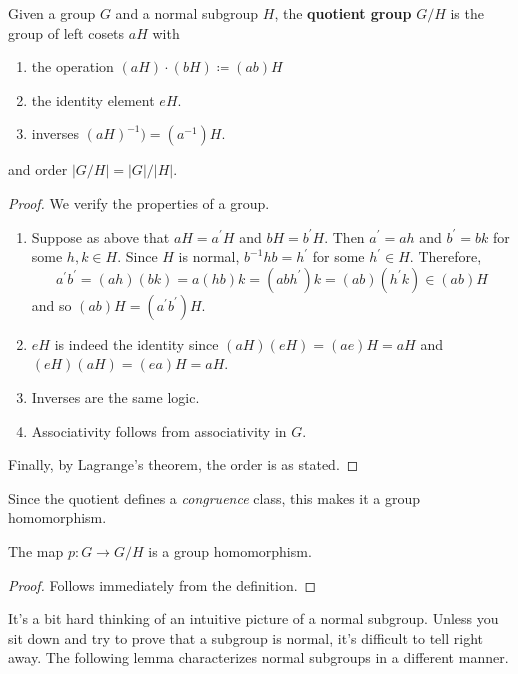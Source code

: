   \begin{definition}
    Given a group $G$ and a normal subgroup $H$, the \textbf{quotient group} $G/H$ is the group of left cosets $aH$ with 
    \begin{enumerate}
      \item the operation $(aH) \cdot (bH) \coloneqq (ab)H$ 
      \item the identity element $eH$. 
      \item inverses $(aH)^{-1}) = (a^{-1})H$. 
    \end{enumerate}
    and order $|G/H| = |G| / |H|$.  
  \end{definition}
  \begin{proof}
    We verify the properties of a group. 
    \begin{enumerate}
      \item Suppose as above that $aH = a^\prime H$ and $bH = b^\prime H$. Then $a^\prime = ah$ and $b^\prime = bk$ for some $h, k \in H$. Since $H$ is normal, $b^{-1} h b = h^\prime$ for some $h^\prime \in H$. Therefore, 
      \begin{equation}
        a^\prime b^\prime = (ah) (bk) = a(hb) k = (ab h^\prime) k = (ab)(h^\prime k) \in (ab) H
      \end{equation}
      and so $(ab)H = (a^\prime b^\prime)H$. 

      \item $eH$ is indeed the identity since $(aH)(eH) = (ae)H = aH$ and $(eH)(aH) = (ea)H = aH$. 
      \item Inverses are the same logic. 
      \item Associativity follows from associativity in $G$. 
    \end{enumerate}
    Finally, by Lagrange's theorem, the order is as stated. 
  \end{proof}

  Since the quotient defines a \textit{congruence} class, this makes it a group homomorphism. 

  \begin{theorem}
    The map $p: G \rightarrow G/H$ is a group homomorphism. 
  \end{theorem}
  \begin{proof}
    Follows immediately from the definition. 
  \end{proof} 

  It's a bit hard thinking of an intuitive picture of a normal subgroup. Unless you sit down and try to prove that a subgroup is normal, it's difficult to tell right away. The following lemma characterizes normal subgroups in a different manner. 

